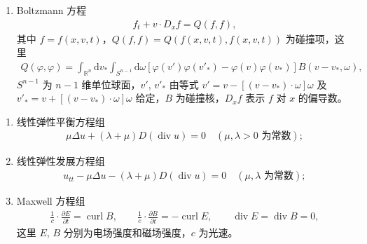 \documentclass[../../main.tex]{subfiles}%
\begin{document}
\begin{examples}[较著名的一些非线性偏微分方程]
\begin{enumerate}[(1)]
\item Boltzmann 方程
\begin{align*}
f_t + v \cdot D_x f = Q(f, f),
\end{align*}
其中 $f=f(x,v,t)$，$Q(f,f)=Q(f(x,v,t),f(x,v,t))$ 为碰撞项，这里
\begin{align*}
Q(\varphi,\varphi) = \int_{\mathbb{R}^n} \mathrm{d}v_* \int_{S^{n-1}} \mathrm{d}\omega [\varphi(v')\varphi(v'_*) - \varphi(v)\varphi(v_*)] B(v-v_*, \omega),
\end{align*}
$S^{n-1}$ 为 $n-1$ 维单位球面，$v'$, $v'_*$ 由等式 $v'=v-[(v-v_*)\cdot\omega]\omega$ 及 $v'_*=v+[(v-v_*)\cdot\omega]\omega$ 给定，$B$ 为碰撞核，$D_x f$ 表示 $f$ 对 $x$ 的偏导数。
\end{enumerate}
\end{examples}

\begin{examples}[较著名的一些线性偏微分方程组]
\begin{enumerate}[(1)]
\item 线性弹性平衡方程组
\begin{align*}
\mu \Delta u + (\lambda + \mu) D(\operatorname{div} u) = 0 \quad (\mu, \lambda > 0 \text{ 为常数});
\end{align*}

\item 线性弹性发展方程组
\begin{align*}
u_{tt} - \mu \Delta u - (\lambda + \mu) D(\operatorname{div} u) = 0 \quad (\mu, \lambda \text{ 为常数});
\end{align*}

\item Maxwell 方程组
\begin{align*}
\frac{1}{c} \cdot \frac{\partial E}{\partial t} = \operatorname{curl} B, \qquad
\frac{1}{c} \cdot \frac{\partial B}{\partial t} = -\operatorname{curl} E, \qquad
\operatorname{div} E = \operatorname{div} B = 0,
\end{align*}
这里 $E$, $B$ 分别为电场强度和磁场强度，$c$ 为光速。
\end{enumerate}
\end{examples}
\end{document}

